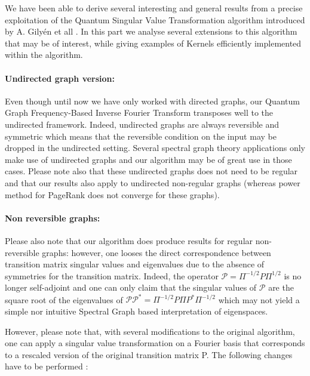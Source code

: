 \documentclass{article}
\begin{document}
We have been able to derive several interesting and general results from a precise exploitation of the Quantum Singular Value Transformation algorithm introduced by A. Gilyén et all \cite{gilyén_su_low_wiebe_2019}. In this part we analyse several extensions to this algorithm that may be of interest, while giving examples of Kernels efficiently implemented within the algorithm.

\paragraph{Undirected graph version:}
Even though until now we have only worked with directed graphs, our Quantum Graph Frequency-Based Inverse Fourier Transform transposes well to the undirected framework. Indeed, undirected graphs are always reversible and symmetric which means that the reversible condition on the input may be dropped in the undirected setting. Several spectral graph theory applications only make use of undirected graphs \cite{ortega_frossard_kovacevic_moura_vandergheynst_2018, shuman_narang_frossard_ortega_vandergheynst_2013, ricaud_borgnat_tremblay_gonçalves_vandergheynst_2019} and our algorithm may be of great use in those cases. Please note also that these undirected graphs does not need to be regular and that our results also apply to undirected non-regular graphs (whereas power method for PageRank does not converge for these graphs).

\paragraph{Non reversible graphs:}
Please also note that our algorithm does produce results for regular non-reversible graphs: however, one looses the direct correspondence between transition matrix singular values and eigenvalues due to the absence of symmetries for the transition matrix. Indeed, the operator $\mathcal{P} = \Pi^{-1/2} P \Pi^{1/2}$ is no longer self-adjoint and one can only claim that the singular values of $\mathcal{P}$ are the square root of the eigenvalues of $\mathcal{P}\mathcal{P}^* = \Pi^{-1/2} P \Pi P^* \Pi^{-1/2}$ which may not yield a simple nor intuitive Spectral Graph based interpretation of eigenspaces.

However, please note that, with several modifications to the original algorithm, one can apply a singular value transformation on a Fourier basis that corresponds to a rescaled version of the original transition matrix P. The following changes have to be performed :
\end{document}
